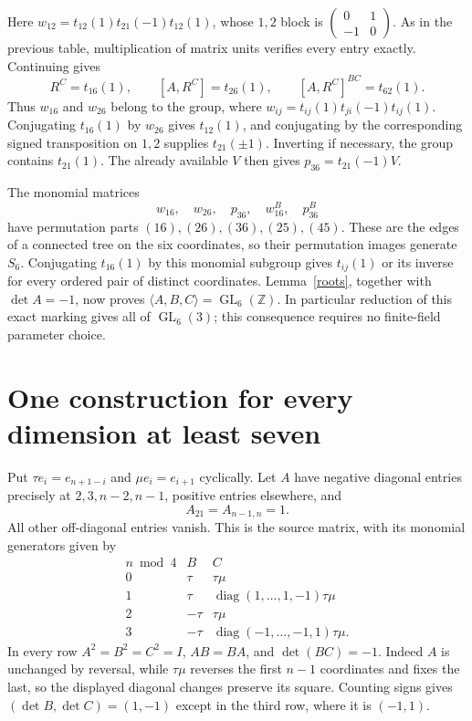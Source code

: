 \documentclass[11pt,a4paper]{article}
\newcommand{\GL}{\operatorname{GL}}\newcommand{\SL}{\operatorname{SL}}
\newcommand{\gen}[1]{\langle#1\rangle}\newcommand{\diag}{\operatorname{diag}}
\begin{document}
Here $w_{12}=t_{12}(1)t_{21}(-1)t_{12}(1)$, whose $1,2$ block is
$\left(\begin{smallmatrix}0&1\\-1&0\end{smallmatrix}\right)$.
As in the previous table, multiplication of matrix units verifies
every entry exactly. Continuing gives
\[
 R^C=t_{16}(1),\qquad [A,R^C]=t_{26}(1),\qquad
 [A,R^C]^{BC}=t_{62}(1).                              \tag{5}
\]
Thus $w_{16}$ and $w_{26}$ belong to the group, where
$w_{ij}=t_{ij}(1)t_{ji}(-1)t_{ij}(1)$.
Conjugating $t_{16}(1)$ by $w_{26}$ gives $t_{12}(1)$, and conjugating
by the corresponding signed transposition on $1,2$ supplies
$t_{21}(\pm1)$. Inverting if necessary, the group contains $t_{21}(1)$.
The already available $V$ then gives
$p_{36}=t_{21}(-1)V$.

The monomial matrices
\[
             w_{16},\quad w_{26},\quad p_{36},\quad
             w_{16}^{B},\quad p_{36}^{B}                \tag{6}
\]
have permutation parts $(16),(26),(36),(25),(45)$.
These are the edges of a connected tree on the six coordinates,
so their permutation images generate $S_6$. Conjugating $t_{16}(1)$
by this monomial subgroup gives $t_{ij}(1)$ or its inverse for every
ordered pair of distinct coordinates. Lemma~\ref{roots}, together
with $\det A=-1$, now proves $\gen{A,B,C}=\GL_6(\mathbb Z)$.
In particular reduction of this exact marking gives all of
$\GL_6(3)$; this consequence requires no finite-field parameter choice.

\section{One construction for every dimension at least seven}
Put $\tau e_i=e_{n+1-i}$ and $\mu e_i=e_{i+1}$ cyclically.
Let $A$ have negative diagonal entries precisely at
$2,3,n-2,n-1$, positive entries elsewhere, and
\[
                         A_{21}=A_{n-1,n}=1.             \tag{7}
\]
All other off-diagonal entries vanish. This is the source matrix,
with its monomial generators given by
\[
\begin{array}{c|cc}
n\bmod4&B&C\\\hline
0&\tau&\tau\mu\\
1&\tau&\diag(1,\ldots,1,-1)\tau\mu\\
2&-\tau&\tau\mu\\
3&-\tau&\diag(-1,\ldots,-1,1)\tau\mu.
\end{array}                                               \tag{8}
\]
In every row $A^2=B^2=C^2=I$, $AB=BA$, and $\det(BC)=-1$.
Indeed $A$ is unchanged by reversal, while $\tau\mu$ reverses the
first $n-1$ coordinates and fixes the last, so the displayed diagonal
changes preserve its square. Counting signs gives
$(\det B,\det C)=(1,-1)$ except in the third row, where it is $(-1,1)$.
\end{document}
